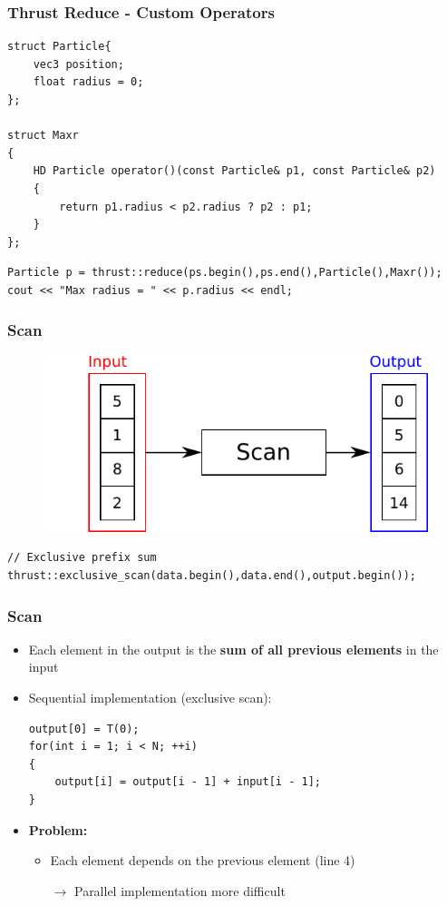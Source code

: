 \documentclass[aspectratio=169,handout]{beamer}
\begin{document}
\begin{frame}[fragile]
\frametitle{Thrust Reduce - Custom Operators}

\begin{lstlisting}
struct Particle{
	vec3 position;
	float radius = 0;
};

struct Maxr
{
	HD Particle operator()(const Particle& p1, const Particle& p2)
	{
		return p1.radius < p2.radius ? p2 : p1;
	}
};

\end{lstlisting}

\begin{lstlisting}
Particle p = thrust::reduce(ps.begin(),ps.end(),Particle(),Maxr());
cout << "Max radius = " << p.radius << endl;
\end{lstlisting}
\end{frame}


\begin{frame}[fragile]
\frametitle{Scan}
\begin{figure}
	\centering
	\includegraphics[height=0.6\textheight]{o_scan}
\end{figure}

\begin{lstlisting}
// Exclusive prefix sum
thrust::exclusive_scan(data.begin(),data.end(),output.begin());
\end{lstlisting}
\end{frame}

\begin{frame}[fragile]
	\frametitle{Scan}
	\begin{itemize}
		\item Each element in the output is the \textbf{sum of all previous elements} in the input
		\item<2-> Sequential implementation (exclusive scan):
\begin{lstlisting}
output[0] = T(0);
for(int i = 1; i < N; ++i)
{
	output[i] = output[i - 1] + input[i - 1];
}
\end{lstlisting}
\item<3-> \textbf{Problem:}
\begin{itemize}
	\item Each element depends on the previous element (line 4)
	\item[$\rightarrow$] Parallel implementation more difficult 
\end{itemize}

\end{itemize}
\end{frame}
\end{document}
